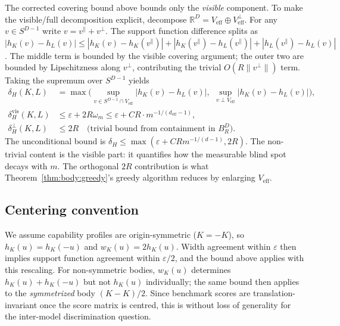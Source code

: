 \documentclass{article}
\begin{document}
The corrected covering bound above bounds only the \emph{visible}
component. To make the visible/full decomposition explicit, decompose
$\mathbb{R}^D = V_{\mathrm{eff}} \oplus V_{\mathrm{eff}}^\perp$. For
any $v \in S^{D-1}$ write $v = v^{\parallel} + v^{\perp}$. The
support function difference splits as $|h_K(v) - h_L(v)| \le |h_K(v) -
h_K(v^{\parallel})| + |h_K(v^{\parallel}) - h_L(v^{\parallel})| +
|h_L(v^{\parallel}) - h_L(v)|$. The middle term is bounded by the
visible covering argument; the outer two are bounded by Lipschitzness
along $v^{\perp}$, contributing the trivial $O(R\|v^{\perp}\|)$ term.
Taking the supremum over $S^{D-1}$ yields
\begin{align}
\delta_H(K, L) &= \max\!\Big(\sup_{v \in S^{D-1} \cap V_{\mathrm{eff}}}
                            |h_K(v) - h_L(v)|,\ \,
                            \sup_{v \perp V_{\mathrm{eff}}}
                            |h_K(v) - h_L(v)|\Big),
\\
\delta_H^{\mathrm{vis}}(K, L) &\le \varepsilon
                              + 2 R \omega_m
                              \le \varepsilon
                              + C R \cdot m^{-1/(d_{\mathrm{eff}} - 1)},
\\
\delta_H^{\perp}(K, L) &\le 2R \quad \text{(trivial bound from
                                                  containment in $B_R^D$).}
\end{align}
The unconditional bound is $\delta_H \le \max(\varepsilon + CR
m^{-1/(d-1)}, 2R)$. The non-trivial content is the visible part: it
quantifies how the measurable blind spot decays with $m$. The
orthogonal $2R$ contribution is what Theorem~\ref{thm:body:greedy}'s
greedy algorithm reduces by enlarging $V_{\mathrm{eff}}$.

\subsection*{Centering convention}

We assume capability profiles are origin-symmetric ($K = -K$), so
$h_K(u) = h_K(-u)$ and $w_K(u) = 2 h_K(u)$. Width agreement within
$\varepsilon$ then implies support function agreement within
$\varepsilon/2$, and the bound above applies with this rescaling.
For non-symmetric bodies, $w_K(u)$ determines $h_K(u) + h_K(-u)$ but
not $h_K(u)$ individually; the same bound then applies to the
\emph{symmetrized} body $(K - K)/2$. Since benchmark scores are
translation-invariant once the score matrix is centred, this is
without loss of generality for the inter-model discrimination
question.
\end{document}

